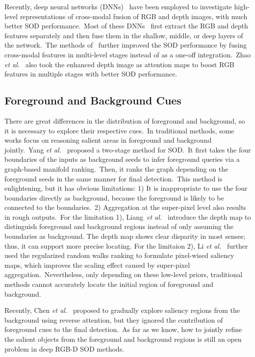 \documentclass[journal]{IEEEtran}
\def\etal{{\em et al.~}}
\begin{document}
Recently, deep neural networks (DNNs)~\cite{he2016deep} have been employed to investigate high-level representations of cross-modal fusion of RGB and depth images, with much better SOD performance.\ 
Most of these DNNs~\cite{chen2019multi,han2017cnns,wang2019adaptive} first extract the RGB and depth features separately and then fuse them in the shallow, middle, or deep layers of the network.\  
The methods of~\cite{chen2018progressively,chen2019three,li2020icnet,piao2019depth} further improved the SOD performance by fusing cross-modal features in multi-level stages instead of as a one-off integration.\
Zhao \etal\cite{zhao2019Contrast} also took the enhanced depth image as attention maps to boost RGB features in multiple stages with better SOD performance.

\subsection{Foreground and Background Cues}
\vspace{-3pt}
There are great differences in the distribution of foreground and background, so it is necessary to explore their respective cues.\
In traditional methods, some works focus on reasoning salient areas in foreground and background jointly.\ 
Yang \etal\cite{yang2013saliency} proposed a two-stage method for SOD.\  
It first takes the four boundaries of the inputs as background seeds to infer foreground queries via a graph-based manifold ranking.\ 
Then, it ranks the graph depending on the foreground seeds in the same manner for final detection.\ 
This method is enlightening, but it has obvious limitations: 1) It is inappropriate to use the four boundaries directly as background, because the foreground is likely to be connected to the boundaries.\ 
2) Aggregation at the super-pixel level also results in rough outputs.\ 
For the limitation 1), 
Liang~\etal\cite{liang2018stereoscopic} introduce the depth map to distinguish foreground and background regions instead of only assuming the boundaries as background. The depth map shows clear disparity in most senses; thus, it can support more precise locating.
For the limitaion 2), Li \etal\cite{li2015robust} further used the regularized random walks ranking to formulate pixel-wised saliency maps, which improves the scaling effect caused by super-pixel aggregation.\ 
Nevertheless, only depending on these low-level priors, traditional methods cannot accurately locate the initial region of foreground and background.  

Recently, Chen \etal\cite{chen2018reverse} proposed to gradually explore saliency regions from the background using reverse attention, but they ignored the contribution of foreground cues to the final detection.\ 
As far as we know, how to jointly refine the salient objects from the foreground and background regions is still an open problem in deep RGB-D SOD methods.
\end{document}
